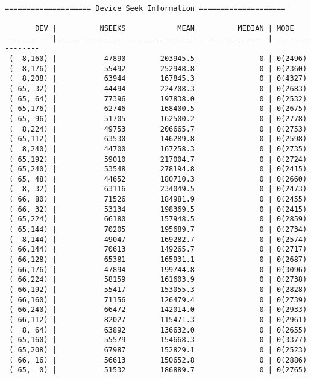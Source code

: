\documentclass{article}
\begin{document}
\newpage\begin{verbatim}

==================== Device Seek Information ====================

       DEV |          NSEEKS            MEAN          MEDIAN | MODE           
---------- | --------------- --------------- --------------- | ---------------
 (  8,160) |           47890        203945.5               0 | 0(2496)
 (  8,176) |           55492        252948.8               0 | 0(2360)
 (  8,208) |           63944        167845.3               0 | 0(4327)
 ( 65, 32) |           44494        224708.3               0 | 0(2683)
 ( 65, 64) |           77396        197838.0               0 | 0(2532)
 ( 65,176) |           62746        168400.5               0 | 0(2675)
 ( 65, 96) |           51705        162500.2               0 | 0(2778)
 (  8,224) |           49753        206665.7               0 | 0(2753)
 ( 65,112) |           63530        146289.8               0 | 0(2598)
 (  8,240) |           44700        167258.3               0 | 0(2735)
 ( 65,192) |           59010        217004.7               0 | 0(2724)
 ( 65,240) |           53548        278194.8               0 | 0(2415)
 ( 65, 48) |           44652        180710.3               0 | 0(2660)
 (  8, 32) |           63116        234049.5               0 | 0(2473)
 ( 66, 80) |           71526        184981.9               0 | 0(2455)
 ( 66, 32) |           53134        198369.5               0 | 0(2415)
 ( 65,224) |           66180        157948.5               0 | 0(2859)
 ( 65,144) |           70205        195689.7               0 | 0(2734)
 (  8,144) |           49047        169282.7               0 | 0(2574)
 ( 66,144) |           70613        149265.7               0 | 0(2717)
 ( 66,128) |           65381        165931.1               0 | 0(2687)
 ( 66,176) |           47894        199744.8               0 | 0(3096)
 ( 66,224) |           58159        161603.9               0 | 0(2738)
 ( 66,192) |           55417        153055.3               0 | 0(2828)
 ( 66,160) |           71156        126479.4               0 | 0(2739)
 ( 66,240) |           66472        142014.0               0 | 0(2933)
 ( 66,112) |           82027        115471.3               0 | 0(2961)
 (  8, 64) |           63892        136632.0               0 | 0(2655)
 ( 65,160) |           55579        154668.3               0 | 0(3377)
 ( 65,208) |           67987        152829.1               0 | 0(2523)
 ( 66, 16) |           56613        150652.8               0 | 0(2886)
 ( 65,  0) |           51532        186889.7               0 | 0(2765)

\end{verbatim}
\end{document}
